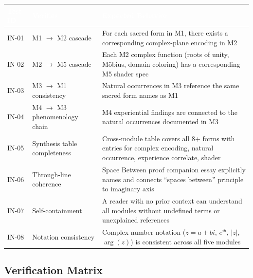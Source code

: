 \documentclass[11pt,letterpaper]{article}
\newcommand{\tableheader}[1]{\textbf{\sffamily\textcolor{white}{#1}}}
\begin{document}
\begin{center}
\begin{tabularx}{\textwidth}{C{1.5cm}L{4.5cm}X}
\toprule
{}
\tableheader{Test ID} & \tableheader{Verifies} & \tableheader{Expected Behavior} \\
\midrule
IN-01 & M1 $\to$ M2 cascade & For each sacred form in M1, there exists a corresponding complex-plane encoding in M2 \\
IN-02 & M2 $\to$ M5 cascade & Each M2 complex function (roots of unity, M\"{o}bius, domain coloring) has a corresponding M5 shader spec \\
IN-03 & M3 $\to$ M1 consistency & Natural occurrences in M3 reference the same sacred form names as M1 \\
IN-04 & M4 $\to$ M3 phenomenology chain & M4 experiential findings are connected to the natural occurrences documented in M3 \\
IN-05 & Synthesis table completeness & Cross-module table covers all 8+ forms with entries for complex encoding, natural occurrence, experience correlate, shader \\
IN-06 & Through-line coherence & Space Between proof companion essay explicitly names and connects ``spaces between'' principle to imaginary axis \\
IN-07 & Self-containment & A reader with no prior context can understand all modules without undefined terms or unexplained references \\
IN-08 & Notation consistency & Complex number notation ($z = a+bi$, $e^{i\theta}$, $|z|$, $\arg(z)$) is consistent across all five modules \\
\bottomrule
\end{tabularx}
\end{center}

\subsection{Verification Matrix}
\end{document}
